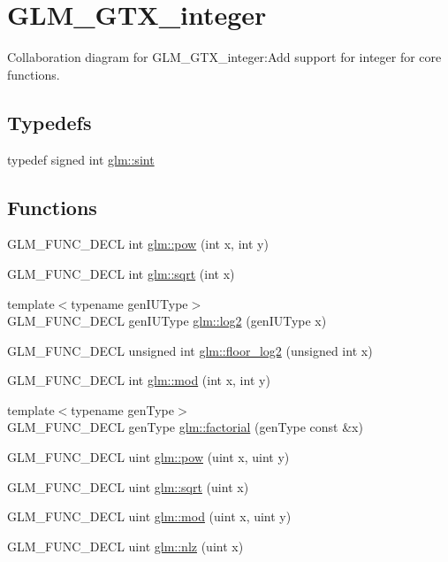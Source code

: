 \hypertarget{group__gtx__integer}{
\section{GLM\_\-GTX\_\-integer}
\label{group__gtx__integer}
}


Collaboration diagram for GLM\_\-GTX\_\-integer:Add support for integer for core functions.  
\subsection*{Typedefs}
\begin{CompactItemize}
\item 
typedef signed int \hyperlink{group__gtx__integer_g73643e09d8c6d362418aec541fdb987d}{glm::sint}
\end{CompactItemize}
\subsection*{Functions}
\begin{CompactItemize}
\item 
GLM\_\-FUNC\_\-DECL int \hyperlink{group__gtx__integer_g9642514a44a67afa70966d756f040ca9}{glm::pow} (int x, int y)
\item 
GLM\_\-FUNC\_\-DECL int \hyperlink{group__gtx__integer_g78e2e68330e91d350fcfc2f4831cad12}{glm::sqrt} (int x)
\item 
{\footnotesize template$<$typename genIUType$>$ }\\GLM\_\-FUNC\_\-DECL genIUType \hyperlink{group__gtx__integer_g43dcff81ada0f7d4a29b25ca2a0cef2f}{glm::log2} (genIUType x)
\item 
GLM\_\-FUNC\_\-DECL unsigned int \hyperlink{group__gtx__integer_g7011b4e1c1e1ed492149b028feacc00e}{glm::floor\_\-log2} (unsigned int x)
\item 
GLM\_\-FUNC\_\-DECL int \hyperlink{group__gtx__integer_gb9d22df91aac4d9eb925a4910f556f1b}{glm::mod} (int x, int y)
\item 
{\footnotesize template$<$typename genType$>$ }\\GLM\_\-FUNC\_\-DECL genType \hyperlink{group__gtx__integer_g57ba2a6a2729f23ba4848bbad551dcd1}{glm::factorial} (genType const \&x)
\item 
GLM\_\-FUNC\_\-DECL uint \hyperlink{group__gtx__integer_ga8229e850c3cc4ad83492fe390ada044}{glm::pow} (uint x, uint y)
\item 
GLM\_\-FUNC\_\-DECL uint \hyperlink{group__gtx__integer_g457e9efca8339bf918d319e9c55f7c8f}{glm::sqrt} (uint x)
\item 
GLM\_\-FUNC\_\-DECL uint \hyperlink{group__gtx__integer_gb8f9ec0ca93ca90669434224818f0750}{glm::mod} (uint x, uint y)
\item 
GLM\_\-FUNC\_\-DECL uint \hyperlink{group__gtx__integer_gcbe62fd2384464c16ea30ecc4defc11c}{glm::nlz} (uint x)
\end{CompactItemize}


